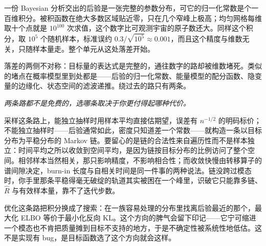 一份 Bayesian 分析交出的后验是一张完整的参数分布，可它的归一化常数是个一百维积分。被积函数在绝大多数区域贴近零，只在几个窄峰上极高；均匀网格每维取十个点就是 \(10^{100}\) 次求值，这个数字比可观测宇宙的原子数还大。同样这个积分，取 \(10^{5}\) 个随机样本，标准误约 \(0.3/\sqrt{10^{5}}\approx0.001\)，而且这个精度与维数无关，只随样本量走。整个单元从这处落差开始。

落差的两侧不对称：目标量的表达式是完整的，通往数字的路却被维数堵死。类似的堵点在概率模型里到处都是——后验的归一化常数、能量模型的配分函数、隐变量的边缘化、状态空间的滤波递推。绕过去的路只有两条。

\begin{center}
\end{center}

\emph{两条路都不是免费的，选哪条取决于你更付得起哪种代价。}

采样这条路上，能独立抽样时用样本平均直接估期望，误差有 \(n^{-1/2}\) 的明码标价；不能独立抽样时——后验通常如此，密度只知道差一个常数——就构造一条以目标分布为平稳分布的 Markov 链。要留心的是链的合法性来自遍历性而不是样本独立：时间平均之所以收敛到空间平均，是因为链按目标分布的比例访问了整个空间。相邻样本当然相关，那只影响精度，不影响相合性；而收敛快慢由转移算子的谱间隙决定，burn-in 长度与自相关时间是同一件事的两种说法。链没跨过模态时，你手里那条平稳得毫无破绽的轨道其实被困在一个峰里，识破它只能靠多链、\(\widehat R\) 与有效样本量，靠不了迭代步数。

优化这条路把积分换成了搜索：在一族容易处理的分布里找离后验最近的那个，最大化 ELBO 等价于最小化反向 KL。这个方向的脾气会留下印记——它宁可缩进一个模态也不肯把质量摊到目标不支持的地方，于是不确定性被系统性地低估。这不是实现有 bug，是目标函数选了这个方向就会这样。

